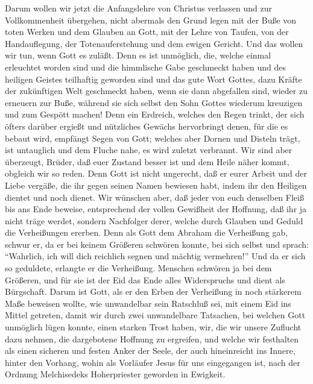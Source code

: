 Darum wollen wir jetzt die Anfangslehre von Christus
verlassen und zur Vollkommenheit übergehen, nicht abermals den Grund
legen mit der Buße von toten Werken und dem Glauben an Gott,
 mit der Lehre von Taufen, von der Handauflegung, der
Totenauferstehung und dem ewigen Gericht.  Und das wollen
wir tun, wenn Gott es zuläßt.  Denn es ist unmöglich, die,
welche einmal erleuchtet worden sind und die himmlische Gabe geschmeckt
haben und des heiligen Geistes teilhaftig geworden sind 
und das gute Wort Gottes, dazu Kräfte der zukünftigen Welt geschmeckt
haben,  wenn sie dann abgefallen sind, wieder zu erneuern
zur Buße, während sie sich selbst den Sohn Gottes wiederum kreuzigen und
zum Gespött machen!  Denn ein Erdreich, welches den Regen
trinkt, der sich öfters darüber ergießt und nützliches Gewächs
hervorbringt denen, für die es bebaut wird, empfängt Segen von Gott;
 welches aber Dornen und Disteln trägt, ist untauglich und
dem Fluche nahe, es wird zuletzt verbrannt.  Wir sind aber
überzeugt, Brüder, daß euer Zustand besser ist und dem Heile näher
kommt, obgleich wir so reden.  Denn Gott ist nicht
ungerecht, daß er eurer Arbeit und der Liebe vergäße, die ihr gegen
seinen Namen bewiesen habt, indem ihr den Heiligen dientet und noch
dienet.  Wir wünschen aber, daß jeder von euch denselben
Fleiß bis ans Ende beweise, entsprechend der vollen Gewißheit der
Hoffnung,  daß ihr ja nicht träge werdet, sondern
Nachfolger derer, welche durch Glauben und Geduld die Verheißungen
ererben.  Denn als Gott dem Abraham die Verheißung gab,
schwur er, da er bei keinem Größeren schwören konnte, bei sich selbst
 und sprach: ``Wahrlich, ich will dich reichlich segnen
und mächtig vermehren!''  Und da er sich so geduldete,
erlangte er die Verheißung.  Menschen schwören ja bei dem
Größeren, und für sie ist der Eid das Ende alles Widerspruchs und dient
als Bürgschaft.  Darum ist Gott, als er den Erben der
Verheißung in noch stärkerem Maße beweisen wollte, wie unwandelbar sein
Ratschluß sei, mit einem Eid ins Mittel getreten,  damit
wir durch zwei unwandelbare Tatsachen, bei welchen Gott unmöglich lügen
konnte, einen starken Trost haben, wir, die wir unsere Zuflucht dazu
nehmen, die dargebotene Hoffnung zu ergreifen,  und
welche wir festhalten als einen sicheren und festen Anker der Seele, der
auch hineinreicht ins Innere, hinter den Vorhang,  wohin
als Vorläufer Jesus für uns eingegangen ist, nach der Ordnung
Melchisedeks Hoherpriester geworden in Ewigkeit.

